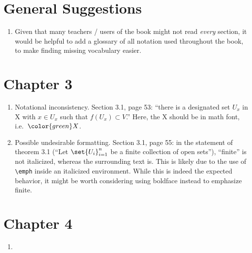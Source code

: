 \documentclass{fkletter}
\begin{document}
\section*{General Suggestions}
\begin{enumerate}
  \item Given that many teachers / users of the book might not read \emph{every}
    section, it would be helpful to add a glossary of all notation used
    throughout the book, to make finding missing vocabulary easier.
\end{enumerate}
\section*{Chapter 3}
\begin{enumerate}
  \item Notational inconsistency. Section 3.1, page 53: ``there is a designated
    set $U_x$ in {\color{red} X} with $x \in U_x$ such that $f(U_x) \subset
    V$.'' Here, the {\color{red} X} should be in math font, i.e.\
    ${\color{green} X}$.
  \item Possible undesirable formatting. Section 3.1, page 55: in the statement
    of theorem 3.1 (``Let $\set{U_i}_{i=1}^n$ be a finite collection of open
    sets''), ``finite'' is not italicized, whereas the surrounding text is. This
    is likely due to the use of \verb|\emph| inside an italicized environment.
    While this is indeed the expected behavior, it might be worth considering
    using boldface instead to emphasize finite.
\end{enumerate}
\section*{Chapter 4}
\begin{enumerate}
  \item
\end{enumerate}
\end{document}
